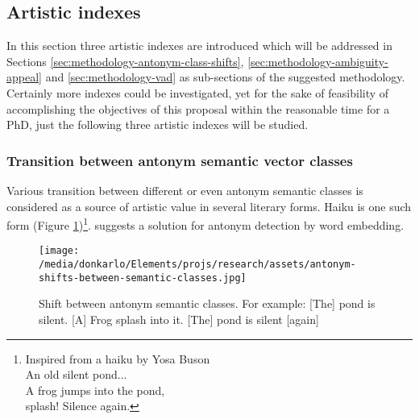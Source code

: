 \documentclass{article}
\begin{document}
	\subsection{Artistic indexes} \label{sec:related-works-artistic value-indexes}
	In this section three artistic indexes are introduced which will be addressed in Sections \ref{sec:methodology-antonym-class-shifts}, \ref{sec:methodology-ambiguity-appeal} and \ref{sec:methodology-vad} as sub-sections of the suggested methodology. Certainly more indexes could be investigated, yet for the sake of feasibility of accomplishing the objectives of this proposal within the reasonable time for a PhD, just the following three artistic indexes will be studied.  
	\subsubsection{Transition between antonym semantic vector classes}
	Various transition between different or even antonym semantic classes is considered as a source of artistic value in several literary forms. Haiku is one such form (Figure \ref{fig:antonym-shifts-between-semantic-classes})\footnote{
		Inspired from  a haiku by Yosa Buson
		\\
		An old silent pond...
		\\
		A frog jumps into the pond,
		\\
		splash! Silence again.
	}. \citet{ono-2015-word-embedding-based-antonym-detection-using-thesauri-and-distributional-information} suggests a solution for antonym detection by word embedding. 
	\begin{figure}[h!]
		\centering
		\texttt{[image: /media/donkarlo/Elements/projs/research/assets/antonym-shifts-between-semantic-classes.jpg]}
		\caption{Shift between antonym semantic classes. For example: [The] pond is silent. [A] Frog splash into it. [The] pond is silent [again]}
		\label{fig:antonym-shifts-between-semantic-classes}
	\end{figure}
\end{document}
